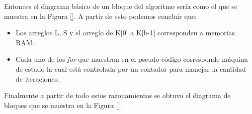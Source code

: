 Entonces el diagrama básico de un bloque del algoritmo sería como el que se muestra en la Figura \ref{}. A partir de esto podemos concluir que:
\begin{itemize}
\item Los arreglos L, S y el arreglo de K[0] a K[b-1] corresponden a memorias RAM.
\item Cada uno de los \textit{for} que muestran en el pseudo-código corresponde máquina de estado la cual está controlada por un contador para manejar la cantidad de iteraciones.
\end{itemize}
Finalmente a partir de todo estos razonamientos se obtuvo el diagrama de bloques que se muestra en la Figura \ref{}.
